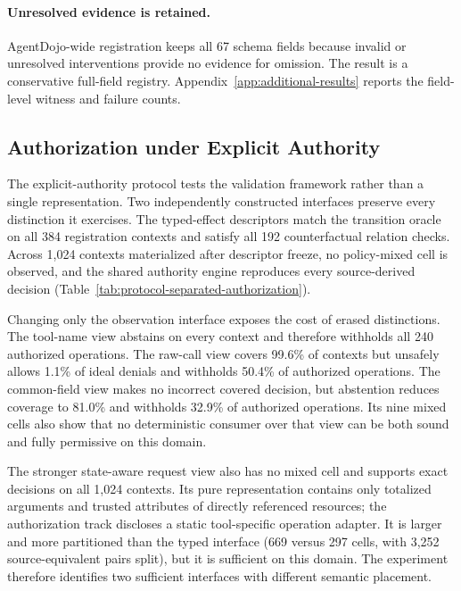 \paragraph{Unresolved evidence is retained.}
AgentDojo-wide registration keeps all 67 schema fields because invalid or
unresolved interventions provide no evidence for omission. The result is a
conservative full-field registry.
Appendix~\ref{app:additional-results} reports the field-level witness and
failure counts.

\subsection{Authorization under Explicit Authority}



The explicit-authority protocol tests the validation framework rather than a
single representation. Two independently constructed interfaces preserve every
distinction it exercises. The typed-effect descriptors match the
transition oracle on all 384 registration contexts and satisfy all 192
counterfactual relation checks. Across 1,024 contexts materialized after
descriptor freeze, no policy-mixed cell is observed, and the shared authority
engine reproduces every source-derived decision (Table~\ref{tab:protocol-separated-authorization}).

Changing only the observation interface exposes the cost of erased
distinctions. The tool-name view abstains on every context and therefore
withholds all 240 authorized operations. The raw-call view covers 99.6\% of
contexts but unsafely allows 1.1\% of ideal denials and withholds 50.4\% of
authorized operations. The common-field view makes no incorrect covered
decision, but abstention reduces coverage to 81.0\% and withholds 32.9\% of
authorized operations. Its nine mixed cells also show that no deterministic
consumer over that view can be both sound and fully permissive on this domain.

The stronger state-aware request view also has no mixed cell and supports exact
decisions on all 1,024 contexts. Its pure representation contains only
totalized arguments and trusted attributes of directly referenced resources;
the authorization track discloses a static tool-specific operation adapter.
It is larger and more partitioned than the typed interface (669 versus 297
cells, with 3,252 source-equivalent pairs split), but it is sufficient on this
domain. The experiment therefore identifies two sufficient interfaces with
different semantic placement.

